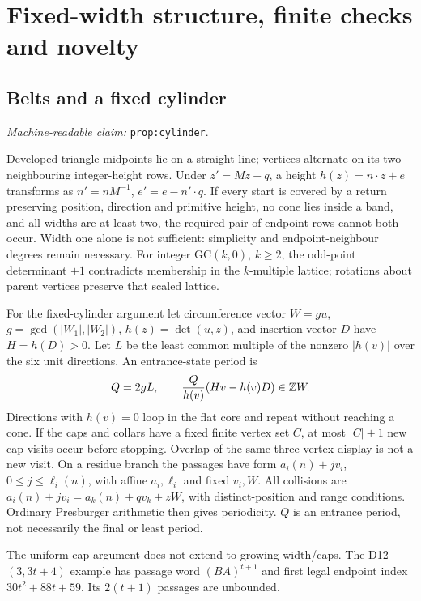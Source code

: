\documentclass[11pt]{amsart}
\newcommand{\Z}{\mathbb Z}
\newcommand{\record}[1]{\nolinkurl{#1}}
\newcommand{\claimid}[1]{\par\nopagebreak\noindent\textit{Machine-readable claim:} \record{#1}.\par}
\theoremstyle{definition}\newtheorem{definition}{Definition}
\begin{document}
\section{Fixed-width structure, finite checks and novelty}\label{sec:evidence}
\subsection{Belts and a fixed cylinder}\label{prop:cylinder}
\claimid{prop:cylinder}
Developed triangle midpoints lie on a straight line; vertices alternate
on its two neighbouring integer-height rows. Under $z'=Mz+q$, a height
$h(z)=n\cdot z+e$ transforms as $n'=nM^{-1}$,
$e'=e-n'\cdot q$. If every start is covered by a return preserving
position, direction and primitive height, no cone lies inside a band,
and all widths are at least two, the required pair of endpoint rows
cannot both occur. Width one alone is not sufficient: simplicity and
endpoint-neighbour degrees remain necessary. For integer GC$(k,0)$,
$k\ge2$, the odd-point determinant $\pm1$ contradicts membership in
the $k$-multiple lattice; rotations about parent vertices preserve that
scaled lattice.

For the fixed-cylinder argument let circumference vector $W=gu$,
$g=\gcd(|W_1|,|W_2|)$, $h(z)=\det(u,z)$, and insertion vector $D$
have $H=h(D)>0$. Let $L$ be the least common multiple of the nonzero
$|h(v)|$ over the six unit directions. An entrance-state period is
\begin{equation}\label{eq:cylinder}
 Q=2gL,\qquad {Q\over h(v)}(Hv-h(v)D)\in\Z W.
\end{equation}
Directions with $h(v)=0$ loop in the flat core and repeat without
reaching a cone. If the caps and collars have a fixed finite vertex
set $C$, at most $|C|+1$ new cap visits occur before stopping. Overlap
of the same three-vertex display is not a new visit. On a residue
branch the passages have form $a_i(n)+jv_i$, $0\le j\le\ell_i(n)$,
with affine $a_i,\ell_i$ and fixed $v_i,W$. All collisions are
$a_i(n)+jv_i=a_k(n)+qv_k+zW$, with distinct-position and range
conditions. Ordinary Presburger arithmetic then gives periodicity.
$Q$ is an entrance period, not necessarily the final or least period.

The uniform cap argument does not extend to growing width/caps.
The D12$(3,3t+4)$ example has passage word $(BA)^{t+1}$ and first
legal endpoint index $30t^2+88t+59$. Its $2(t+1)$ passages are unbounded.
\end{document}

